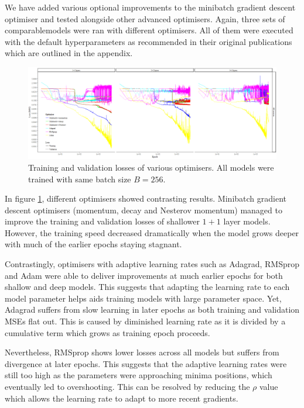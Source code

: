 \documentclass[11pt]{article} %
\theoremstyle{plain}
\theoremstyle{definition}
\begin{document}
We have added various optional improvements to the minibatch gradient descent optimiser and tested alongside other advanced optimisers. Again, three sets of comparablemodels were ran with different optimisers. All of them were executed with the default hyperparameters as recommended in their original publications which are outlined in the appendix.

\begin{figure}[H]
	\centering
	\includegraphics[width=1\textwidth]{optimisers.PNG}
	\caption{Training and validation losses of various optimisers. All models were trained with same batch size \(B=256\).}
	\label{fig:optimisers}
\end{figure}

In figure \ref{fig:optimisers}, different optimisers showed contrasting results. Minibatch gradient descent optimisers (momentum, decay and Nesterov momentum) managed to improve the training and validation losses of shallower \(1+1\) layer models. However, the training speed decreased dramatically when the model grows deeper with much of the earlier epochs staying stagnant.

Contrastingly, optimisers with adaptive learning rates such as Adagrad, RMSprop and Adam were able to deliver improvements at much earlier epochs for both shallow and deep models. This suggests that adapting the learning rate to each model parameter helps aids training models with large parameter space. Yet, Adagrad suffers from slow learning in later epochs as both training and validation MSEs flat out. This is caused by diminished learning rate as it is divided by a cumulative term which grows as training epoch proceeds.

Nevertheless, RMSprop shows lower losses across all models but suffers from divergence at later epochs. This suggests that the adaptive learning rates were still too high as the parameters were approaching minima positions, which eventually led to overshooting. This can be resolved by reducing the \(\rho\) value which allows the learning rate to adapt to more recent gradients. 
\end{document}
